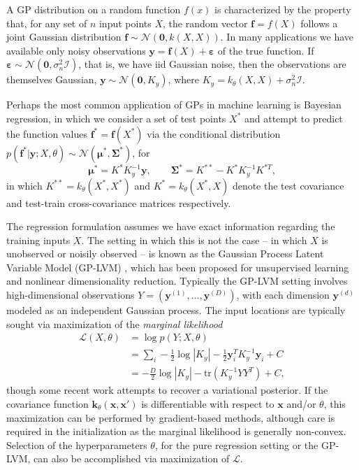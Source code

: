 \documentclass{article}
\newcommand{\N}{\mathcal{N}}
\newcommand{\I}{\mathcal{I}}
\newcommand{\tr}{\text{tr}}
\newcommand{\eps}{\varepsilon}
\renewcommand{\v}[1]{\mathbf{#1}}
\begin{document}
A GP distribution on a random function $f(x)$ is characterized by the property that, for
any set of $n$ input points $X$, the random vector $\v{f} = f(X)$ follows a joint Gaussian
distribution $\v{f} \sim \N(\v{0}, k(X, X)).$ In many applications we
have available only noisy observations $\v{y} = \v{f}(X) + \v{\eps}$
of the true function. If $\v{\eps}\sim \N(\v{0}, \sigma_n^2 \I)$, that
is, we have iid Gaussian noise, then the observations are themselves Gaussian, $\v{y} \sim \N(\v{0},
K_y)$, where $K_y = k_\theta(X, X) + \sigma^2_n\I$. 

Perhaps the most common application of GPs in machine learning is
Bayesian regression, in which we consider a set of 
test points $X^*$ and attempt to predict the function values $\v{f}^*
= \v{f}(X^*)$ via the conditional distribution
$p(\v{f}^* | \v{y}; X, \theta) \sim \N\left(\v{\mu}^*,
  \v{\Sigma}^*\right)$, for
\[\v{\mu}^* = K^* K_y^{-1} \v{y}, \qquad
\v{\Sigma}^* = K^{**} - K^* K_y^{-1} K^{*T},\]
in which $K^{**} = k_\theta(X^*,X^*)$ and $K^* =
k_\theta(X^*, X)$ denote the test covariance and test-train
cross-covariance matrices respectively. 

The regression formulation assumes we have exact information regarding
the training inputs $X$. The setting in which this is not the case --
in which $X$ is unobserved or noisily observed -- is known as the Gaussian Process Latent Variable Model (GP-LVM)
  \cite{lawrence_gplvm}, which has been proposed for unsupervised
  learning and nonlinear dimensionality reduction. Typically the
  GP-LVM setting involves high-dimensional observations $Y = (\v{y}^{(1)}, \ldots,
  \v{y}^{(D)})$, with each dimension $\v{y}^{(d)}$ modeled as an
  independent Gaussian process. The input locations are typically sought via maximization of the {\em marginal likelihood}
\begin{align}
\mathcal{L}(X, \theta) &= \log p(Y ; X, \theta) \\
&= \sum_i -\frac{1}{2}\log |K_y| - \frac{1}{2} \v{y}_i^T K_y^{-1} \v{y}_i + C\\
&= -\frac{D}{2}\log |K_y| - \tr(K_y^{-1} YY^T) + C,\label{eqn:mlik}
\end{align}
though some recent work \citep{titsias,
  lawrence} attempts to recover a variational posterior. If the
covariance function $\v{k}_\theta(\v{x}, \v{x}')$ is differentiable
with respect to $\v{x}$ and/or $\theta$, this maximization can be
performed by gradient-based methods, although care is required in the
initialization as the marginal likelihood is generally non-convex.
Selection of the hyperparameters $\theta$, for the pure regression setting or the
GP-LVM, can also be accomplished via maximization of $\mathcal{L}$.
\end{document}
